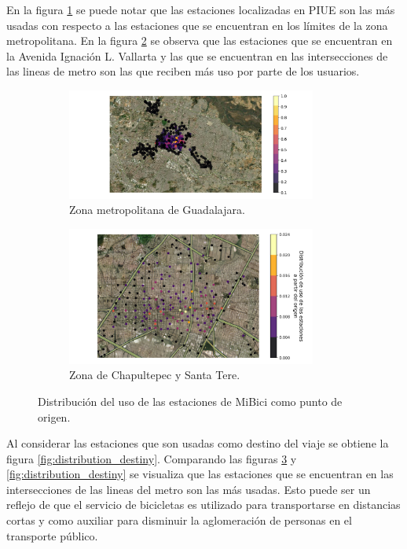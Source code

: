 En la figura \ref{fig:distribution_station_all_origin} se puede notar que las estaciones localizadas en PIUE son las más usadas con respecto a las estaciones que se encuentran en los límites de la zona metropolitana. En la figura \ref{fig:distribution_station_zoom_origin} se observa que las estaciones que se encuentran en la Avenida Ignación L. Vallarta y las que se encuentran en las intersecciones de las lineas de metro son las que reciben más uso por parte de los usuarios.

\begin{figure}[H]
    \centering
    \begin{subfigure}[b]{8.2cm}
        \includegraphics[width=8.2cm]{Graphics/repetition_origen.png}
        \caption{Zona metropolitana de Guadalajara.}
        \label{fig:distribution_station_all_origin}
    \end{subfigure}
    \begin{subfigure}[b]{8.2cm}
        \includegraphics[width=8.2cm]{Graphics/repetition_origen_zoom.png}
        \caption{Zona de Chapultepec y Santa Tere.}
        \label{fig:distribution_station_zoom_origin}
    \end{subfigure}
    \caption{Distribución del uso de las estaciones de MiBici como punto de origen.}
    \label{fig:distribution_origin}
\end{figure}

Al considerar las estaciones que son usadas como destino del viaje se obtiene la figura \ref{fig:distribution_destiny}. Comparando las figuras \ref{fig:distribution_origin} y \ref{fig:distribution_destiny} se visualiza que las estaciones que se encuentran en las intersecciones de las lineas del metro son las más usadas. Esto puede ser un reflejo de que el servicio de bicicletas es utilizado para transportarse en distancias cortas y como auxiliar para disminuir la aglomeración de personas en el transporte público.

